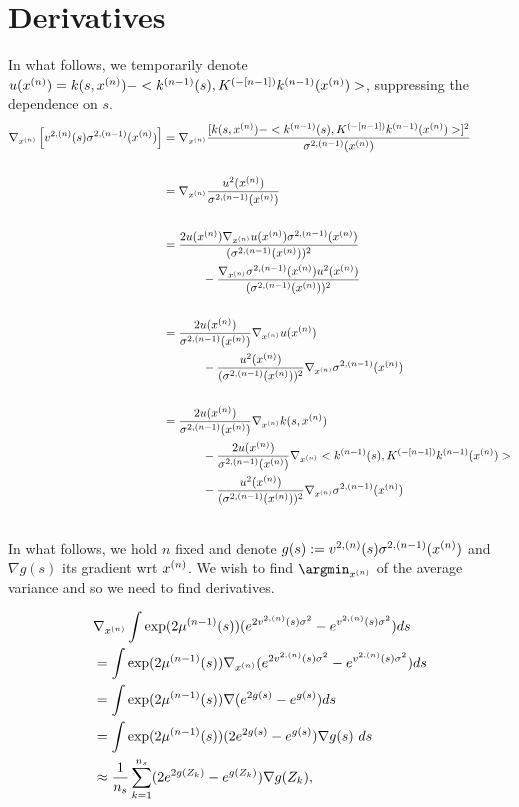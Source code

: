 \section{Derivatives}
In what follows, we temporarily denote $u(x^{(n)}) = k(s, x^{(n)})  - < k^{(n-1)} (s) ,  K^{(-[n-1])} k^{(n-1)} (x^{(n)}) > $, suppressing 
the dependence on $s$. 
\begin{align}
 \begin{split}
  \gxn \left[ \vnssqr\sqnm(\xn) \right] &= \gxn \frac{[k(s, \xn)  - < \knm (s) ,  \Kinvnm \knm (\xn) > ]^2}{\signxn}\\\\
%
%
%
%
&= \gxn \frac{ u^2 (\xn) }{\signxn}\\\\
%
%
%
&=\frac{ 2u(\xn)\gxn u(\xn) \signxn}{(\signxn)^2} \\
	    &\bars- \frac{\gxn \signxn u^2(\xn)}{(\signxn)^2} \\\\
%
%
%
&=\frac{ 2u(\xn)}{\signxn} \gxn u(\xn)\\
	    &\bars- \frac{u^2(\xn)}{(\signxn)^2}\gxn \signxn \\\\
%
%
%
%
&=\frac{ 2u(\xn)}{\signxn} \gxn k(s , \xn) \\
	    &\bars - \frac{ 2u(\xn)}{\signxn} \gxn< \knm (s) ,  \Kinvnm \knm (\xn) > \\
	    &\bars - \frac{u^2(\xn)}{(\signxn)^2}\gxn \signxn \\\\
%
%
%
%
%
%
%
 \end{split}
\end{align}


In what follows, we hold $n$ fixed and denote $g(s) : = v^{2,(n)}(s) \sigma ^{2 , (n-1)}(x^{(n)})$ and $\nabla g(s)$ its gradient wrt $x^{(n)}$. We wish to find 
$\argmin_{\xn}$ of the average variance and so we need to find derivatives.

\begin{align}
 \begin{split}
 & \gxn \int \exp(2\mu^{(n-1)}(s)) (e^{2\vnssqr \sigma^2 } - e^{\vnssqr\sigma^2 }) ds \\
%
%
% 
&=  \int \exp(2\mu^{(n-1)}(s)) \gxn (e^{2\vnssqr\sigma^2 } - e^{\vnssqr\sigma^2 }) ds \\
%
%
%
%
%
% 
&=  \int \exp(2\mu^{(n-1)}(s)) \nabla (e^{2g(s) } - e^{g(s)}) ds \\
%
%
% 
%
%
%
% 
&=  \int \exp(2\mu^{(n-1)}(s)) (2e^{2g(s) } - e^{g(s)})\nabla g(s)\  ds \\
%
%
% 
%
%
%
% 
&\approx \frac{1}{n_s}  \sum_{k=1}^{n_s} (2e^{2g(Z_k) } - e^{g(Z_k)})\nabla g(Z_k), \\
%
%
% 
 \end{split}
\end{align}

